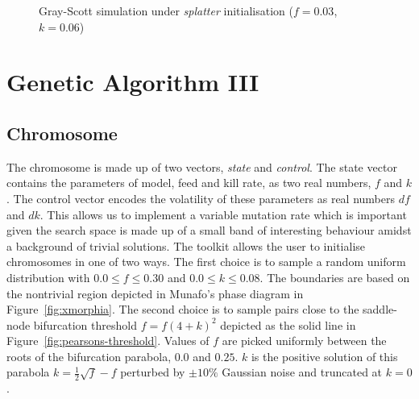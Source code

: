 \begin{figure}[!h]
            \hfill
            \caption{Gray-Scott simulation under \textit{splatter} initialisation ($f = 0.03$, $k = 0.06$)}
\label{fig:splatter}
\end{figure}

\section{Genetic Algorithm III}

\subsection{Chromosome}
The chromosome is made up of two vectors, \textit{state} and \textit{control}. The state vector contains the parameters of model, feed and kill rate, as two real numbers, $f$ and $k$. The control vector encodes the volatility of these parameters as real numbers $df$ and $dk$. This allows us to implement a variable mutation rate which is important given the search space is made up of a small band of interesting behaviour amidst a background of trivial solutions. The toolkit allows the user to initialise chromosomes in one of two ways. The first choice is to sample a random uniform distribution with $0.0 \leq f \leq 0.30$ and $0.0 \leq k \leq 0.08$. The boundaries are based on the nontrivial region depicted in Munafo's phase diagram in Figure~\ref{fig:xmorphia}. The second choice is to sample pairs close to the saddle-node bifurcation threshold $f = f(4+k)^2$ depicted as the solid line in Figure~\ref{fig:pearsons-threshold}. Values of $f$ are picked uniformly between the roots of the bifurcation parabola, $0.0$ and $0.25$. $k$ is the positive solution of this parabola $k = \frac{1}{2}\sqrt{f} - f$ perturbed by $\pm 10\%$ Gaussian noise and truncated at $k = 0$.

